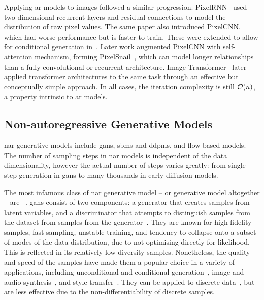 Applying \gls{ar} models to images followed a similar progression.
PixelRNN~\cite{oord2016pixelrnn} used two-dimensional recurrent layers and
residual connections to model the distribution of raw pixel values. The same
paper also introduced PixelCNN, which had worse performance but is faster to
train. These were extended to allow for conditional generation
in~\cite{oord2016pixelcnn}. Later work augmented PixelCNN with self-attention
mechanism, forming PixelSnail~\cite{chen2017snail}, which can model longer
relationships than a fully convolutional or recurrent architecture. Image
Transformer~\cite{parmar2018image} later applied transformer architectures to
the same task through an effective but conceptually simple approach. In all
cases, the iteration complexity is still $\mathcal{O}(n)$, a property intrinsic to
\gls{ar} models.

\subsection{Non-autoregressive Generative Models}
\label{subsec:nagm}

\Acrfull{nar} generative models include \glspl{gan}, \glspl{sbm} and
\glspl{ddpm}, and flow-based models. The number of sampling steps in \gls{nar}
models is independent of the data dimensionality, however the actual number of
steps varies greatly: from single-step generation in \glspl{gan} to many
thousands in early diffusion models.

The most infamous class of \gls{nar} generative model -- or generative model
altogether -- are ~\cite{goodfellow2014gan}. \Glspl{gan} consist
of two components: a generator that creates samples from latent variables, and a
discriminator that attempts to distinguish samples from the dataset from samples
from the generator~\cite{goodfellow2014gan}. They are known for high-fidelity
samples, fast sampling, unstable training, and tendency to collapse onto a
subset of modes of the data distribution, due to not optimising directly for
likelihood. This is reflected in its relatively low-diversity samples.
Nonetheless, the quality and speed of the samples have made them a popular
choice in a variety of applications, including unconditional and conditional
generation~\cite{tero2018stylegan,andrew2018biggan}, image and audio
synthesis~\cite{liu2020audiogan}, and style transfer~\cite{zhu2017cyclegan}.
They can be applied to discrete data~\cite{autume2019scratchgan}, but are
less effective due to the non-differentiability of discrete samples.

